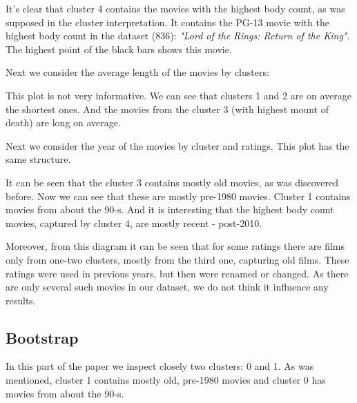 \documentclass[a4paper,14pt]{article}
\begin{document}
            
\begin{center}
\end{center}
 

It's clear that cluster 4 contains the movies with the highest body count, as was supposed in the cluster interpretation. It contains the PG-13 movie with the highest body count in the dataset (836): \textit{"Lord of the Rings: Return of the King"}. The highest point of the black bars shows this movie. 

Next we consider the average length of the movies by clusters: 
\begin{center}
\end{center}
 
This plot is not very informative. We can see that clusters 1 and 2 are on average the shortest ones. And the movies from the cluster 3 (with highest mount of death) are long on average. 

Next we consider the year of the movies by cluster and ratings. This plot has the same structure. 

\begin{center}
\end{center}
 
It can be seen that the cluster 3 contains mostly old movies, as was discovered before. Now we can see that these are mostly pre-1980 movies. Cluster 1 contains movies from about  the 90-s.
And it is interesting that the highest body count movies, captured by cluster 4, are mostly recent - post-2010.

Moreover, from this diagram it can be seen that for some ratings there are films only from one-two clusters, mostly from the third one, capturing old films. These ratings were used in previous years, but then were renamed or changed. As there are only several such movies in our dataset, we do not think it influence any results.


\subsection{Bootstrap}

In this part of the paper we inspect closely two clusters: 0 and 1. As was mentioned, cluster 1 contains mostly old, pre-1980 movies and cluster 0 has movies from about the 90-s.
\end{document}
